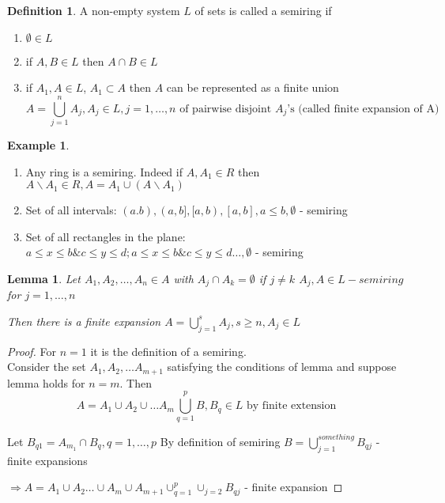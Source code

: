 \documentclass[11pt,a4paper]{report}
\newtheorem{lemma}[theorem]{Lemma}
\theoremstyle{plain}
\theoremstyle{definition}
\newtheorem*{defn}{Definition}
\newtheorem*{eg}{Example}
\theoremstyle{remark}
\begin{document}
\begin{defn}
   A non-empty system $L$ of sets is called a semiring if
   \begin{enumerate}
     \item $\emptyset \in L$
     \item if $A, B \in L$ then  $A \cap B \in L$
     \item if $A_1, A \in L$, $A_1 \subset A$ then $A$ can be represented as a finite union
\[A= \bigcup_{j=1}^n A_j, A_j \in L, j=1,\dots,n \text{ of pairwise disjoint } A_j \text{'s (called finite expansion of A)}\]
   \end{enumerate}
\end{defn}

\begin{eg}\;\
  \begin{enumerate}
  \item Any ring is a semiring. Indeed if $A, A_1 \in R$ then $A\backslash A_1 \in R, A = A_1 \cup (A\backslash A_1)$
  \item Set of all intervals: $(a.b), (a,b], [a,b), [a,b], a \leq b, \emptyset$ - semiring %
  \item Set of all rectangles in the plane: $a \leq x \leq b \& c \leq y \leq d ; a \leq x \leq b \& c \leq y \leq d \dots, \emptyset$ - semiring %
  \end{enumerate}
\end{eg}

\begin{lemma}\label{finite_union_expansion}
  Let $A_1, A_2, \dots, A_n \in A$ with $A_j \cap A_k = \emptyset$ if $j \neq k$
  $A_j,A \in L - semiring$ for $j=1,\dots,n$

  Then there is a finite expansion $A= \bigcup_{j=1}^s A_j, s \geq n, A_j \in L$

\end{lemma}

\begin{proof}
  For $n=1$ it is the definition of a semiring.\\
  Consider the set $A_1, A_2, \dots A_{m+1}$ satisfying the conditions of lemma and suppose lemma holds for $n=m$. Then
  \[ A = A_1 \cup A_2 \cup \dots A_m \bigcup_{q=1}^p B, B_q \in L \text{ by finite extension}\]

  Let $B_{q1} = A_{m_1} \cap B_q, q=1,\dots,p$
  By definition of semiring $B = \bigcup_{j=1}^{something} B_{qj}$ - finite expansions

  $\Rightarrow A = A_1 \cup A_2 \dots \cup A_m \cup A_{m+1} \cup_{q=1}^p \cup_{j=2}B_{qj}$ - finite expansion
\end{proof}
\end{document}
